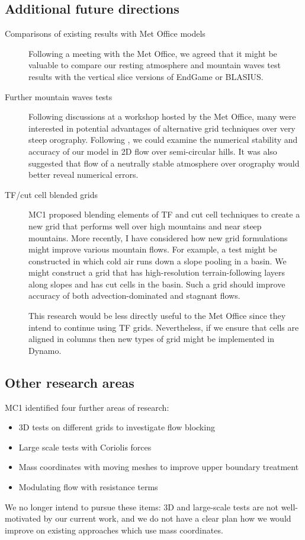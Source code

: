 \documentclass[a4paper]{article}
\begin{document}
\subsection*{Additional future directions}
\begin{description}
	\item[Comparisons of existing results with Met Office models]{Following a meeting with the Met Office, we agreed that it might be valuable to compare our resting atmosphere and mountain waves test results with the vertical slice versions of EndGame or BLASIUS.}
	\item[Further mountain waves tests]{Following discussions at a workshop hosted by the Met Office, many were interested in potential advantages of alternative grid techniques over very steep orography.  Following \citet{yamazaki-satomura2010}, we could examine the numerical stability and accuracy of our model in 2D flow over semi-circular hills.  It was also suggested that flow of a neutrally stable atmosphere over orography would better reveal numerical errors.}
	\item[TF/cut cell blended grids]{
MC1 proposed blending elements of TF and cut cell techniques to create a new grid that performs well over high mountains and near steep mountains.
More recently, I have considered how new grid formulations might improve various mountain flows.  For example, a test might be constructed in which cold air runs down a slope pooling in a basin.  We might construct a grid that has high-resolution terrain-following layers along slopes and has cut cells in the basin.  Such a grid should improve accuracy of both advection-dominated and stagnant flows.

This research would be less directly useful to the Met Office since they intend to continue using TF grids.  Nevertheless, if we ensure that cells are aligned in columns then new types of grid might be implemented in Dynamo.}
\end{description}

\subsection*{Other research areas}
MC1 identified four further areas of research:
\begin{itemize}
	\item 3D tests on different grids to investigate flow blocking
	\item Large scale tests with Coriolis forces
	\item Mass coordinates with moving meshes to improve upper boundary treatment
	\item Modulating flow with resistance terms
\end{itemize}
We no longer intend to pursue these items: 3D and large-scale tests are not well-motivated by our current work, and we do not have a clear plan how we would improve on existing approaches which use mass coordinates. 
\end{document}
